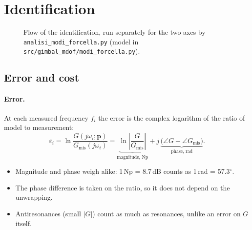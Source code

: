 \documentclass[10pt,a4paper]{article}
\numberwithin{equation}{section}
\begin{document}
\section{Identification}\label{sec:method}
\begin{figure}[H]\centering
{}
\caption{Flow of the identification, run separately for the two axes by \texttt{analisi\_modi\_forcella.py} (model in \texttt{src/gimbal\_mdof/modi\_forcella.py}).}\label{fig:flow}
\end{figure}

\subsection{Error and cost}
\paragraph{Error.} At each measured frequency $f_i$ the error is the complex logarithm of the ratio of model to measurement:
\begin{equation}
\varepsilon_i=\ln\frac{G(j\omega_i;\mathbf p)}{G_\mathrm{mis}(j\omega_i)}=\underbrace{\ln\left|\frac{G}{G_\mathrm{mis}}\right|}_{\text{magnitude, Np}}+j\,\underbrace{\bigl(\angle G-\angle G_\mathrm{mis}\bigr)}_{\text{phase, rad}} .
\end{equation}
\begin{itemize}
\item Magnitude and phase weigh alike: 1\,Np = 8.7\,dB counts as 1\,rad = 57.3$^\circ$.
\item The phase difference is taken on the ratio, so it does not depend on the unwrapping.
\item Antiresonances (small $|G|$) count as much as resonances, unlike an error on $G$ itself.
\end{itemize}
\end{document}
